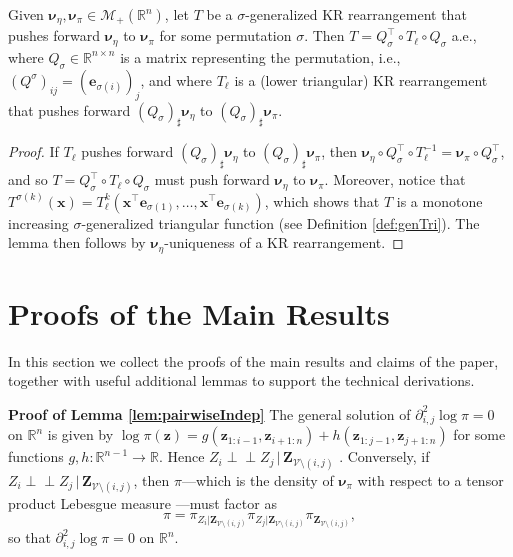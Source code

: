 \documentclass[twoside,11pt]{article}
\newcommand{\push}{_\sharp}                                      %
\newcommand{\orth}{ \perp\!\!\!\perp }  %
\newcommand{\borelm}{\mathscr{M}}
\newcommand{\borelmp}{\borelm_+}
\newcommand{\genm}{\boldsymbol{\nu} }   %
\newcommand{\re}{\mathbb{R}}
\newcommand{\ra}{\rightarrow}
\newcommand{\Vc}{\mathcal{V}}
\newcommand{\xb}{\boldsymbol{x}}
\newcommand{\Zb}{\boldsymbol{Z}}
\newcommand{\zb}{\boldsymbol{z}}
\newcommand{\eb}{\boldsymbol{e}}
\begin{document}
\begin{lemma}
  Given 
  $\genm_\eta,\genm_\pi \in \borelmp(\re^n)$,
  let $T$ be a $\sigma$-generalized KR rearrangement that pushes
  forward $\genm_\eta$ to $\genm_\pi$ for some permutation $\sigma$.
  Then $T = Q_\sigma^\top \circ T_\ell \circ Q_\sigma$ a.e., where
  $Q_\sigma \in \re^{n \times n}$ is a matrix representing the permutation,
  i.e., $(Q^\sigma)_{ij}=(\eb_{\sigma(i)})_j$, and where
  $T_\ell$ is a (lower triangular) KR rearrangement that
  pushes forward 
  $(Q_\sigma)\push \genm_\eta$ to 
  $(Q_\sigma)\push \genm_\pi$.
\end{lemma}
\begin{proof}
%
%
%
If $T_\ell$ pushes forward $(Q_\sigma)\push \genm_\eta$ to 
$(Q_\sigma)\push \genm_\pi$,
then $\genm_\eta \circ Q_\sigma^\top \circ T^{-1}_\ell = \genm_\pi \circ Q_\sigma^\top$, and so
$T = Q_\sigma^\top \circ T_\ell \circ Q_\sigma$ must 
push forward $\genm_\eta$ to $\genm_\pi$.
Moreover, notice that %
$T^{\sigma(k)}(\xb)=T_\ell^k(  \xb^\top \eb_{\sigma(1)} , \ldots,  \xb^\top \eb_{\sigma(k)})$, which
shows that $T$ is a monotone increasing $\sigma$-generalized triangular function
(see Definition \ref{def:genTri}).
The lemma then follows by $\genm_\eta$-uniqueness of a KR rearrangement.
\end{proof}

%
%
%
%
%
%
%
%
%
%
%
%
%
%
%
%
%
%
%
%
%
%
%
%


\section{Proofs of the Main Results}
\label{sec:proofs}
%
%

In this section we collect the proofs of the main results and claims of the paper,
together with useful additional lemmas to support the technical
derivations.
\medskip

\noindent
{\bf Proof of Lemma \ref{lem:pairwiseIndep}}
The general solution of $\partial^2_{i,j} \log \pi = 0$ on $\re^n$ is given by
$\log \pi(\zb) = g(\zb_{1:i-1}, \zb_{i+1:n}) + h(\zb_{1:j-1}, \zb_{j+1:n})$ for
some  functions $g,h:\re^{n-1} \ra \re$. Hence 
$Z_i \orth Z_j \,\vert\, \Zb_{\Vc\setminus (i,j)}$ \citep{lauritzen1996graphical}.
Conversely, if $Z_i \orth Z_j \,\vert\, \Zb_{\Vc\setminus (i,j)}$, then
$\pi$---which is the density of 
$\genm_\pi$ with respect to a tensor product Lebesgue measure \citep{lauritzen1996graphical}---must factor as 
%
\begin{equation}
\pi = \pi_{Z_i \vert \Zb_{\Vc\setminus (i,j)} }
     \pi_{Z_j \vert \Zb_{\Vc\setminus (i,j)} }
     \pi_{\Zb_{\Vc\setminus (i,j)} }, 
\end{equation}
%
%
%
so that
$\partial^2_{i,j} \log \pi = 0$ on $\re^n$.    
\hfill\BlackBox\\[2mm]
\end{document}
